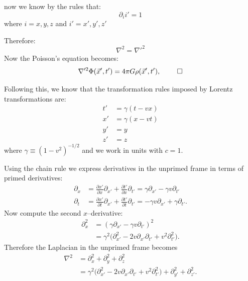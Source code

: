 \documentclass[10pt,twocoloumn]{article}
\begin{document}
now we know by the rules that:
\begin{equation}
    \partial_i i' = 1
\end{equation}
where $i=x,y,z$ and $i'=x',y',z'$

Therefore:
\begin{equation}
\nabla^2 = \nabla'^2
\end{equation}
Now the Poisson's equation becomes:
\begin{equation}
\nabla'^2 \Phi(\vec x',t') = 4\pi G\rho(\vec x' , t'), \ \qed
\end{equation}

Following this, we know that the transformation rules imposed by Lorentz transformations are:
\begin{align}
t' &= \gamma(t - v x)\\
x' &= \gamma(x - v t)\\
y' &= y\\
z' &= z
\end{align}
where $\gamma \equiv (1-v^2)^{-1/2}$ and we work in units with $c=1$.

Using the chain rule we express derivatives in the unprimed frame in terms of primed derivatives:
\begin{align}
\partial_x &= \frac{\partial x'}{\partial x}\partial_{x'} + \frac{\partial t'}{\partial x}\partial_{t'}
= \gamma\partial_{x'} - \gamma v \partial_{t'}\\
\partial_t &= \frac{\partial x'}{\partial t}\partial_{x'} + \frac{\partial t'}{\partial t}\partial_{t'}
= -\gamma v\partial_{x'} + \gamma\partial_{t'}.
\end{align}
Now compute the second $x$–derivative:
\begin{align}
\partial_x^2
&= (\gamma\partial_{x'} - \gamma v \partial_{t'})^2 \\
&= \gamma^2\big(\partial_{x'}^2 - 2v\partial_{x'}\partial_{t'} + v^2\partial_{t'}^2\big).
\end{align}
Therefore the Laplacian in the unprimed frame becomes
\begin{align}
\nabla^2
&= \partial_x^2 + \partial_y^2 + \partial_z^2 \\
&= \gamma^2\big(\partial_{x'}^2 - 2v\partial_{x'}\partial_{t'} + v^2\partial_{t'}^2\big)
+ \partial_{y'}^2 + \partial_{z'}^2.
  \end{align}
\end{document}
